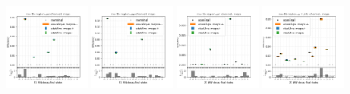 \begin{figure}
    \centering
    \includegraphics[width=0.24\textwidth]{appendices/ttSystReweighting/figures/afterCorr/icata0_ch0_meps.png}
    \includegraphics[width=0.24\textwidth]{appendices/ttSystReweighting/figures/afterCorr/icata0_ch1_meps.png}
    \includegraphics[width=0.24\textwidth]{appendices/ttSystReweighting/figures/afterCorr/icata0_ch2_meps.png}
    \includegraphics[width=0.24\textwidth]{appendices/ttSystReweighting/figures/afterCorr/icata0_ch3_meps.png}


\end{figure}
